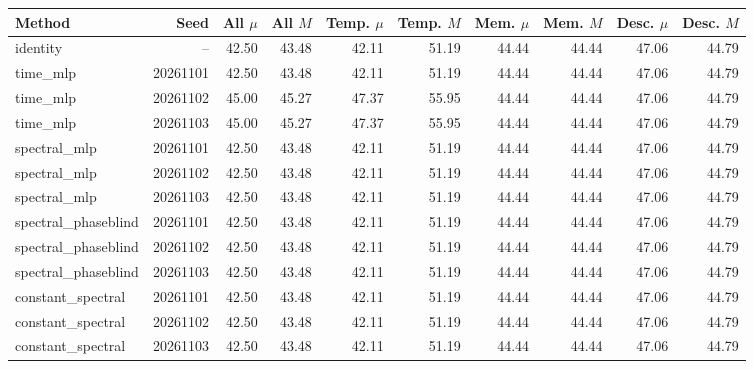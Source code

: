 \begin{tabular}{lr*{8}{r}}
\toprule
Method & Seed & All $\mu$ & All $M$ & Temp. $\mu$ & Temp. $M$ & Mem. $\mu$ & Mem. $M$ & Desc. $\mu$ & Desc. $M$ \\
\midrule
identity & -- & 42.50 & 43.48 & 42.11 & 51.19 & 44.44 & 44.44 & 47.06 & 44.79 \\
time\_mlp & 20261101 & 42.50 & 43.48 & 42.11 & 51.19 & 44.44 & 44.44 & 47.06 & 44.79 \\
time\_mlp & 20261102 & 45.00 & 45.27 & 47.37 & 55.95 & 44.44 & 44.44 & 47.06 & 44.79 \\
time\_mlp & 20261103 & 45.00 & 45.27 & 47.37 & 55.95 & 44.44 & 44.44 & 47.06 & 44.79 \\
spectral\_mlp & 20261101 & 42.50 & 43.48 & 42.11 & 51.19 & 44.44 & 44.44 & 47.06 & 44.79 \\
spectral\_mlp & 20261102 & 42.50 & 43.48 & 42.11 & 51.19 & 44.44 & 44.44 & 47.06 & 44.79 \\
spectral\_mlp & 20261103 & 42.50 & 43.48 & 42.11 & 51.19 & 44.44 & 44.44 & 47.06 & 44.79 \\
spectral\_phaseblind & 20261101 & 42.50 & 43.48 & 42.11 & 51.19 & 44.44 & 44.44 & 47.06 & 44.79 \\
spectral\_phaseblind & 20261102 & 42.50 & 43.48 & 42.11 & 51.19 & 44.44 & 44.44 & 47.06 & 44.79 \\
spectral\_phaseblind & 20261103 & 42.50 & 43.48 & 42.11 & 51.19 & 44.44 & 44.44 & 47.06 & 44.79 \\
constant\_spectral & 20261101 & 42.50 & 43.48 & 42.11 & 51.19 & 44.44 & 44.44 & 47.06 & 44.79 \\
constant\_spectral & 20261102 & 42.50 & 43.48 & 42.11 & 51.19 & 44.44 & 44.44 & 47.06 & 44.79 \\
constant\_spectral & 20261103 & 42.50 & 43.48 & 42.11 & 51.19 & 44.44 & 44.44 & 47.06 & 44.79 \\
\bottomrule
\end{tabular}
